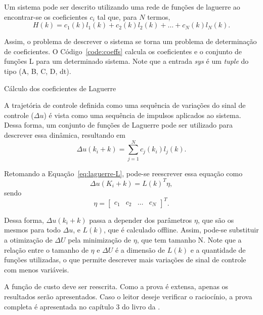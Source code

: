 Um sistema pode ser descrito utilizando uma rede de funções de laguerre ao
encontrar-se os coeficientes \(c_i\) tal que, para \(N\) termos,
%
\begin{equation}
	H(k) = c_{1}(k)l_{1}(k) + c_{2}(k)l_{2}(k) + \hdots{} + c_{N}(k)l_{N}(k).
\end{equation}

Assim, o problema de descrever o sistema se torna um problema de determinação de
coeficientes. O Código~\ref{code:coeffs} calcula os coeficientes e o conjunto de
funções L para um determinado sistema. Note que a entrada \textit{sys} é um
\textit{tuple} do tipo (A, B, C, D, dt).

\begin{code}
	\captionsetup{justification=centering}
	\caption{Cálculo dos coeficientes de Laguerre}%
	\label{code:coeffs}
\end{code}

A trajetória de controle definida como uma sequência de variações do sinal de
controle (\(\Delta{}u\)) é vista como uma sequência de impulsos aplicados ao
sistema. Dessa forma, um conjunto de funções de Laguerre pode ser utilizado para
descrever essa dinâmica, resultando em
%
\begin{equation}
	\Delta{}u(k_i+k) = \sum^{N}_{j=1}{c_j(k_i)l_j(k)}.
\end{equation}

Retomando a Equação~\eqref{eq:laguerre-L}, pode-se reescrever essa equação como
%
\begin{equation}
	\Delta{}u(K_i + k) = {L(k)}^{T}\eta{},
\end{equation}
%
sendo
%
\begin{equation}
	\eta{} = \begin{bmatrix} c_1 & c_2 & \hdots{} & c_N \end{bmatrix}^T.
\end{equation}

Dessa forma, \(\Delta{}u(k_i+k)\) passa a depender dos parâmetros \(\eta{}\),
que são os mesmos para todo \(\Delta{}u\), e \(L(k)\), que é calculado offline.
Assim, pode-se substituir a otimização de \(\Delta{}U\) pela minimização de
\(\eta{}\), que tem tamanho N. Note que a relação entre o tamanho de \(\eta{}\)
e \(\Delta{}U\) é a dimensão de \(L(k)\) e a quantidade de funções utilizadas, o
que permite descrever mais variações de sinal de controle com menos variáveis.

A função de custo deve ser reescrita. Como a prova é extensa, apenas os
resultados serão apresentados. Caso o leitor deseje verificar o raciocínio, a
prova completa é apresentada no capítulo 3 do livro da \textcite{book:wang}.

